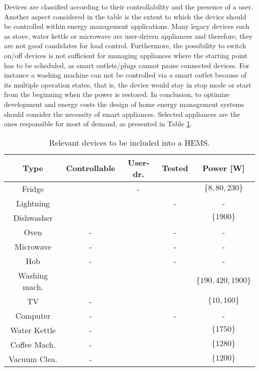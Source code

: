 \documentclass{article}
\newcommand{\cmark}{\ding{51}}\newcommand{\xmark}{\ding{55}}
\begin{document}
Devices are classified according to their controllability and the presence of a user.
Another aspect considered in the table is the extent to which the device should be controlled within energy management applications.
Many legacy devices such as stove, water kettle or microwave are user-driven appliances and therefore, they are not good candidates for load control.
Furthermore, the possibility to switch on/off devices is not sufficient for managing appliances where the starting point has to be scheduled, as smart outlets/plugs cannot pause connected devices.
For instance a washing machine can not be controlled via a smart outlet because of its multiple operation states, that is, the device would stay in stop mode or start from the beginning when the power is restored.
In conclusion, to optimize development and energy costs the design of home energy management systems should consider the necessity of smart appliances.
Selected appliances are the ones responsible for most of demand, as presented in Table \ref{tab:applianceList}.
\begin{table}
 \centering
 \begin{tabular}{c|cccc}
\hline
Type			& Controllable & User-dr. & Tested & Power [W]\\
\hline
Fridge			& \cmark & - & \cmark & $\{8,80,230\}$ \\
Lightning		& \cmark & \cmark & - & - \\
Dishwasher		& \cmark & \cmark & \cmark & $\{1900\}$ \\
Oven			& - & \cmark & - & - \\
Microwave		& - & \cmark & - & - \\
Hob				& - & \cmark & - & - \\
Washing mach.	& \cmark & \cmark & \cmark & $\{190,420,1900\}$ \\
TV				& - & \cmark & \cmark & $\{10,160\}$\\
Computer		& - & \cmark & - & -  \\
Water Kettle	& - & \cmark & \cmark & $\{1750\}$\\
Coffee Mach.	& - & \cmark & \cmark & $\{1280\}$\\
Vacuum Clea.	& - & \cmark & \cmark & $\{1200\}$\\
\hline
\end{tabular}
\caption{Relevant devices to be included into a \ac{HEMS}.}
\label{tab:applianceList}
\end{table}
\end{document}
